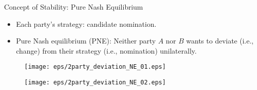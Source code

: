 \documentclass[xcolor=dvipsnames,envcountsect]{beamer}
\begin{document}
\iffalse
\begin{frame}
\begin{figure}
	\begin{center}
		\texttt{[image: eps/2party\_social\_utilities\_deviate22.eps]}
	\end{center}
\end{figure}
\end{frame}


\begin{frame}
\begin{figure}
	\begin{center}
		\texttt{[image: eps/2party\_social\_utilities\_deviate21.eps]}
	\end{center}
\end{figure}
\end{frame}


\begin{frame}
\begin{figure}
	\begin{center}
		\texttt{[image: eps/2party\_social\_utilities\_deviate11.eps]}
	\end{center}
\end{figure}
\end{frame}
\fi


\begin{frame}{Concept of Stability: Pure Nash Equilibrium}
\begin{itemize}
	\item Each party's strategy: candidate nomination.
	\item \alert{Pure Nash equilibrium (PNE)}: Neither party $A$ nor $B$ wants to deviate (i.e., change) from their strategy (i.e., nomination) unilaterally.
\end{itemize}
\end{frame}


\begin{frame}
	\begin{figure}
		\begin{center}
			\texttt{[image: eps/2party\_deviation\_NE\_01.eps]}
		\end{center}
	\end{figure}
\end{frame}


\begin{frame}
	\begin{figure}
		\begin{center}
			\texttt{[image: eps/2party\_deviation\_NE\_02.eps]}
		\end{center}
	\end{figure}
\end{frame}
\end{document}
